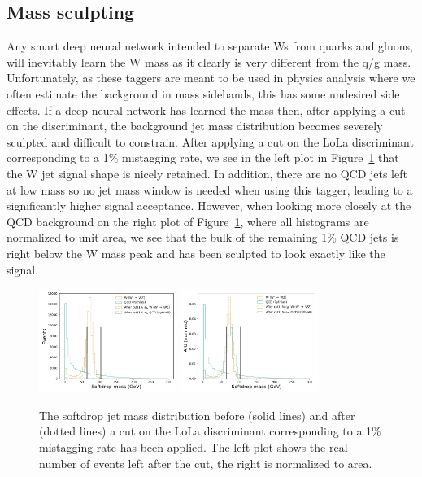\subsection{Mass sculpting}
\label{sec:lola:massculpting}
Any smart deep neural network intended to separate Ws from quarks and gluons, will inevitably learn the W mass as it clearly is very different from the q/g mass. Unfortunately, as these taggers are meant to be used in physics analysis where we often estimate the background in mass sidebands, this has some undesired side effects. If a deep neural network has learned the mass then, after applying a cut on the discriminant, the background jet mass distribution becomes severely sculpted and difficult to constrain. \newline
After applying a cut on the LoLa discriminant corresponding to a 1\% mistagging rate, we see in the left plot in Figure~\ref{fig:lola:masssculpt} that the W jet signal shape is nicely retained. In addition, there are no QCD jets left at low mass so no jet mass window is needed when using this tagger, leading to a significantly higher signal acceptance. However, when looking more closely at 
the QCD background on the right plot of Figure~\ref{fig:lola:masssculpt}, where all histograms are normalized to unit area, we see that the bulk of the remaining 1\% QCD jets is right below the W mass peak and has been sculpted to look exactly like the signal.
\begin{figure}[h!]
\centering
\includegraphics[width=0.4\textwidth]{figures/vtagging/lola/wLola_v6_500rew-mass-afterCut-sigprob_wLola_v6_500rew.png}
\includegraphics[width=0.4\textwidth]{figures/vtagging/lola/wLola_v6_500rew-mass-afterCut-sigprob_wLola_v6_500rew_normed.png}
\caption{The softdrop jet mass distribution before (solid lines) and after (dotted lines) a cut on the LoLa discriminant corresponding to a 1\% mistagging rate has been applied. The left plot shows the real number of events left after the cut, the right is normalized to area.}
\label{fig:lola:masssculpt}
\end{figure}
